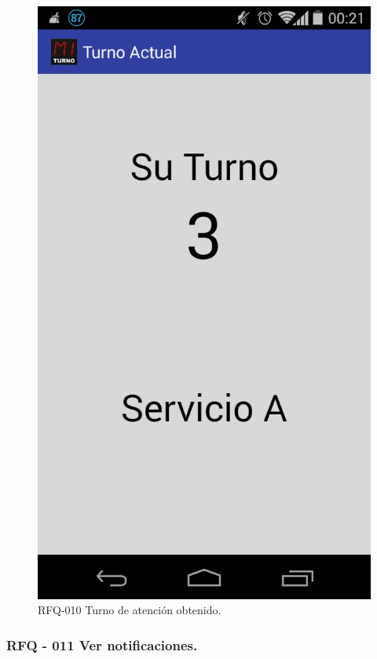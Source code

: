\begin{figure}[H]
\centering
\includegraphics[scale=0.20]{images/capitulo6/rfq010.png}
\caption{RFQ-010 Turno de atención obtenido.}
\label{rfq010}
\end{figure}

\subsubsection{RFQ - 011 Ver notificaciones.}

